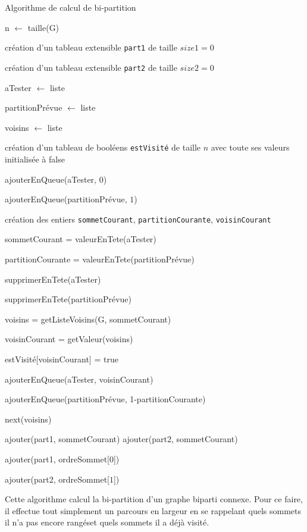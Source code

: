 \documentclass[a4paper,10pt]{article}
\begin{document}
\begin{algorithm}[H]
\caption{Algorithme de calcul de bi-partition}
\BlankLine
n $\leftarrow$ taille(G)

création d'un tableau extensible \texttt{part1} de taille $size1=0$

création d'un tableau extensible \texttt{part2} de taille $size2=0$

aTester $\leftarrow$ liste

partitionPrévue $\leftarrow$ liste

voisins $\leftarrow$ liste

création d'un tableau de booléens \texttt{estVisité} de taille $n$ avec toute ses valeurs initialisée à false

\bigskip
ajouterEnQueue(aTester, $0$)

ajouterEnQueue(partitionPrévue, $1$)

création des entiers \texttt{sommetCourant}, \texttt{partitionCourante}, \texttt{voisinCourant}

{
	sommetCourant = valeurEnTete(aTester)
	
	partitionCourante = valeurEnTete(partitionPrévue)
	
	supprimerEnTete(aTester)
	
	supprimerEnTete(partitionPrévue)
	
	voisins = getListeVoisins(G, sommetCourant)
	
	{
		voisinCourant = getValeur(voisins)
		
		{
			estVisité[voisinCourant] = true
			
			ajouterEnQueue(aTester, voisinCourant)

			ajouterEnQueue(partitionPrévue, 1-partitionCourante)
		}		
		
		next(voisins)
	}
	
	{
		ajouter(part1, sommetCourant)
	}
	{
		ajouter(part2, sommetCourant)
	}
}

ajouter(part1, ordreSommet[$0$])

ajouter(part2, ordreSommet[$1$])


\end{algorithm}
\bigskip

Cette algorithme calcul la bi-partition d'un graphe biparti connexe. Pour ce faire, il effectue tout simplement un parcours en largeur en se rappelant quels sommets il n'a pas encore \og rangés\fg et quels sommets il a déjà \og visité\fg.
\end{document}
